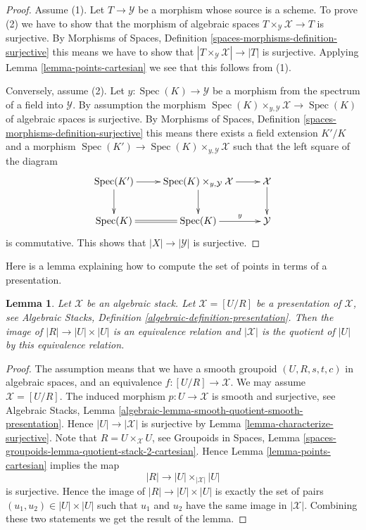 \documentclass{stacks-project}
\theoremstyle{plain}
\newtheorem{lemma}[subsection]{Lemma}
\theoremstyle{definition}
\theoremstyle{remark}
\numberwithin{equation}{subsection}
\def\Spec{\mathop{\mathrm{Spec}}}
\begin{document}
\begin{proof}
Assume (1). Let $T \to \mathcal{Y}$ be a morphism whose source is a scheme.
To prove (2) we have to show that the morphism of algebraic spaces
$T \times_\mathcal{Y} \mathcal{X} \to T$ is surjective. By
Morphisms of Spaces, Definition \ref{spaces-morphisms-definition-surjective}
this means we have to show that
$|T \times_\mathcal{Y} \mathcal{X}| \to |T|$ is surjective.
Applying
Lemma \ref{lemma-points-cartesian}
we see that this follows from (1).

\medskip\noindent
Conversely, assume (2). Let $y : \Spec(K) \to \mathcal{Y}$ be a
morphism from the spectrum of a field into $\mathcal{Y}$. By assumption the
morphism
$\Spec(K) \times_{y, \mathcal{Y}} \mathcal{X} \to \Spec(K)$
of algebraic spaces is surjective. By
Morphisms of Spaces, Definition \ref{spaces-morphisms-definition-surjective}
this means there exists a field extension
$K'/K$ and a morphism
$\Spec(K') \to \Spec(K) \times_{y, \mathcal{Y}} \mathcal{X}$
such that the left square of the diagram
$$
\xymatrix{
\Spec(K') \ar[r] \ar[d] &
\Spec(K) \times_{y, \mathcal{Y}} \mathcal{X} \ar[d] \ar[r] &
\mathcal{X} \ar[d]
\\
\Spec(K) \ar@{=}[r] &
\Spec(K) \ar[r]^-y &
\mathcal{Y}
}
$$
is commutative. This shows that $|X| \to |\mathcal{Y}|$ is surjective.
\end{proof}

\noindent
Here is a lemma explaining how to compute the set of points in terms
of a presentation.

\begin{lemma}
\label{lemma-points-presentation}
Let $\mathcal{X}$ be an algebraic stack.
Let $\mathcal{X} = [U/R]$ be a presentation of $\mathcal{X}$, see
Algebraic Stacks, Definition \ref{algebraic-definition-presentation}.
Then the image of $|R| \to |U| \times |U|$ is an equivalence relation
and $|\mathcal{X}|$ is the quotient of $|U|$ by this equivalence relation.
\end{lemma}

\begin{proof}
The assumption means that we have a smooth groupoid $(U, R, s, t, c)$
in algebraic spaces, and an equivalence $f : [U/R] \to \mathcal{X}$.
We may assume $\mathcal{X} = [U/R]$.
The induced morphism $p : U \to \mathcal{X}$ is smooth and surjective, see
Algebraic Stacks,
Lemma \ref{algebraic-lemma-smooth-quotient-smooth-presentation}.
Hence $|U| \to |\mathcal{X}|$ is surjective by
Lemma \ref{lemma-characterize-surjective}.
Note that $R = U \times_\mathcal{X} U$, see
Groupoids in Spaces,
Lemma \ref{spaces-groupoids-lemma-quotient-stack-2-cartesian}.
Hence
Lemma \ref{lemma-points-cartesian}
implies the map
$$
|R| \longrightarrow |U| \times_{|\mathcal{X}|} |U|
$$
is surjective. Hence the image of $|R| \to |U| \times |U|$ is
exactly the set of pairs $(u_1, u_2) \in |U| \times |U|$
such that $u_1$ and $u_2$ have the same image in $|\mathcal{X}|$.
Combining these two statements we get the result of the lemma.
\end{proof}
\end{document}
